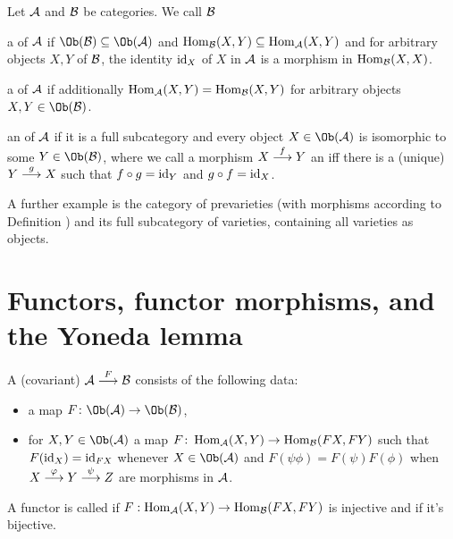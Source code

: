 \documentclass[a4paper,parskip=half,numbers=enddot, DIV=12]{scrreprt}
\begin{document}
\begin{defi}
	Let $\mathcal{A}$ and $\mathcal{B}$ be categories. We call $\mathcal{B}$
	\begin{alphanumerate}
		\item a  of $\mathcal{A}$ if $\Ob(\Bb) \subseteq \Ob(\Aa)$ and $\operatorname{Hom}_{\mathcal{B}}(X,Y) \subseteq \operatorname{Hom}_{\mathcal{A}}(X,Y)$ and for arbitrary objects $X,Y$ of $\mathcal{B}$, the identity $\operatorname{id}_X$ of $X$ in $\mathcal{A}$ is a morphism in $\operatorname{Hom}_{\mathcal{B}}(X,X)$.
		\item a  of $\mathcal{A}$ if additionally $\operatorname{Hom}_{\mathcal{A}}(X,Y) = \operatorname{Hom}_{\mathcal{B}}(X,Y)$ for arbitrary objects $X,Y\in\Ob(\Bb)$.
		\item an  of $\mathcal{A}$ if it is a full subcategory and every object $X\in \Ob(\Aa)$ is isomorphic to some $Y\in\Ob(\Bb)$, where we call a morphism $X\morphism[f] Y$ an  iff there  is a (unique) $Y\morphism[g] X$ such that $f\circ g = \operatorname{id}_Y$ and $g\circ f= \operatorname{id}_X$.
	\end{alphanumerate}
\end{defi}

  A further example is the category of prevarieties (with morphisms according to Definition ) and its full subcategory of varieties, containing all varieties as objects.
    
\section{Functors, functor morphisms, and the Yoneda lemma}
  \begin{defi}
  	A (covariant)  $\Aa\morphism[F]\Bb$ consists of the following data:
  	\begin{itemize}
  		\item a map $F\colon \Ob(\Aa)\to\Ob(\Bb)$,
  		\item for $X,Y\in\Ob(\Aa)$ a map $F\colon\operatorname{Hom}_{\mathcal{A}}(X,Y)\to\operatorname{Hom}_{\mathcal{B}}(FX,FY)$ such that $F(\operatorname{id}_X)=\operatorname{id}_{FX}$ whenever $X\in\Ob(\Aa)$ and $F(\psi\phi)=F(\psi)F(\phi)$ when $X\morphism[\phi]Y\morphism[\psi]Z$ are morphisms in $\mathcal{A}$.
  	\end{itemize}
  	A functor is called  if $F:\operatorname{Hom}_{\mathcal{A}}(X,Y)\to\operatorname{Hom}_{\mathcal{B}}(FX,FY)$ is injective and  if it's bijective.
  \end{defi}
    
  
\end{document}
